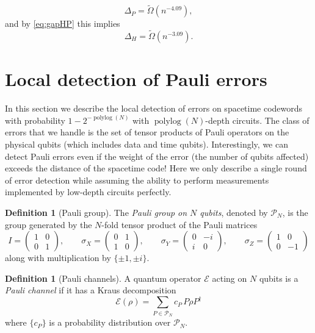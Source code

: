 \documentclass[11pt,letterpaper]{article}
\theoremstyle{definition}
\newtheorem{definition}[theorem]{Definition}
\theoremstyle{remark}
\DeclareMathOperator{\polylog}{polylog}
\newcommand{\cE}{\mathcal E}
\newcommand{\cP}{\mathcal P}
\numberwithin{equation}{section}
\theoremstyle{definition}
\newcommand{\wt}[1]{\widetilde{#1}}
\begin{document}
\begin{equation}
\Delta_P = \wt{\Omega}(n^{-4.09}),
\end{equation}
and by \eqref{eq:gapHP} this implies
\begin{equation}
\Delta_H = \wt{\Omega}(n^{-3.09}).
\end{equation}




%

%

\section{Local detection of Pauli errors}
\label{sec:localDetect}
%
In this section we describe the local detection of errors on spacetime codewords with probability $1 - 2^{-\polylog(N)}$ with $\polylog(N)$-depth circuits. The class of errors that we handle is the set of tensor products of Pauli operators on the physical qubits (which includes data and time qubits). Interestingly, we can detect Pauli errors even if the weight of the error (the number of qubits affected) exceeds the distance of the spacetime code!
%
Here we only describe a single round of error detection while assuming the ability to perform measurements implemented by low-depth circuits perfectly.  %

\begin{definition}[Pauli group]
  The \emph{Pauli group on $N$ qubits}, denoted by $\cP_N$, is the group generated by the $N$-fold tensor product of the Pauli matrices
  \begin{equation}
I=\begin{pmatrix}1&0\\0&1\end{pmatrix}, \qquad \sigma_X=\begin{pmatrix}0&1\\1&0\end{pmatrix}, \qquad \sigma_Y=\begin{pmatrix}0&-i\\i&0\end{pmatrix}, \qquad \sigma_Z=\begin{pmatrix}1&0\\0&-1\end{pmatrix}  
  \end{equation}
  along with multiplication by $\{\pm 1, \pm i\}$.
\end{definition}


\begin{definition}[Pauli channels]
A quantum operator $\cE$ acting on $N$ qubits is a \emph{Pauli channel} if it has a Kraus decomposition 
\begin{equation}
  \cE(\rho) = \sum_{P \in \cP_N} c_P \, P \rho P^\dagger
\end{equation}
where $\{ c_P \}$ is a probability distribution over $\cP_N$. 
\end{definition}
\end{document}
